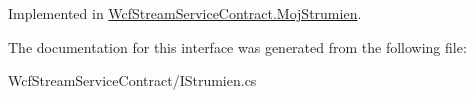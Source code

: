 Implemented in \hyperlink{class_wcf_stream_service_contract_1_1_moj_strumien_a436badd7f8eba36f5f6aae8466ae7416}{Wcf\+Stream\+Service\+Contract.\+Moj\+Strumien}.



The documentation for this interface was generated from the following file\+:\begin{DoxyCompactItemize}
\item 
Wcf\+Stream\+Service\+Contract/I\+Strumien.\+cs\end{DoxyCompactItemize}
